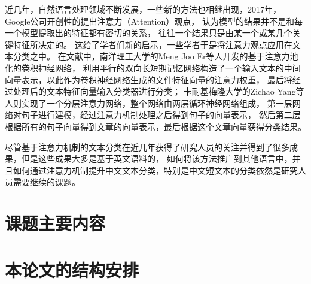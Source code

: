 近几年，自然语言处理领域不断发展，一些新的方法也相继出现，2017年，
Google公司开创性的提出注意力（Attention）观点，
认为模型的结果并不是和每一个模型提取出的特征都有密切的关系，
往往一个结果只是由某一个或某几个关键特征所决定的。
这给了学者们新的启示，一些学者于是将注意力观点应用在文本分类之中。
在文献\cite{er2016attention}中，南洋理工大学的Meng Joo Er等人开发的基于注意力池化的卷积神经网络，
利用平行的双向长短期记忆网络构造了一个输入文本的中间向量表示，以此作为卷积神经网络生成的文件特征向量的注意力权重，
最后将经过处理后的文本特征向量输入分类器进行分类；
卡耐基梅隆大学的Zichao Yang等人则实现了一个分层注意力网络，整个网络由两层循环神经网络组成，
第一层网络对句子进行建模，经过注意力机制处理之后得到句子的向量表示，
然后第二层根据所有的句子向量得到文章的向量表示，最后根据这个文章向量获得分类结果。

尽管基于注意力机制的文本分类在近几年获得了研究人员的关注并得到了很多成果，但是这些成果大多是基于英文语料的，
如何将该方法推广到其他语言中，并且如何通过注意力机制提升中文文本分类，特别是中文短文本的分类依然是研究人员需要继续的课题。
\section{课题主要内容}
\section{本论文的结构安排}
